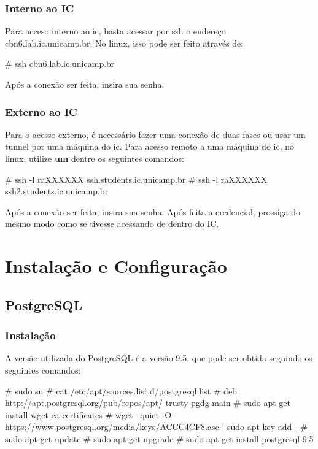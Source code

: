 \documentclass[a4paper,10pt]{article}
\begin{document}
        \subsubsection{Interno ao IC}
        Para acceso interno ao ic, basta acessar por ssh o endereço cbn6.lab.ic.unicamp.br. No linux, isso pode ser feito através de:
        \begin{spverbatim}
        # ssh cbn6.lab.ic.unicamp.br
        \end{spverbatim}

        Após a conexão ser feita, insira sua senha.
        \subsubsection{Externo ao IC}
        Para o acesso externo, é necessário fazer uma conexão de duas fases ou usar um tunnel por uma máquina do ic. Para acesso remoto a uma máquina do ic, no linux, utilize \textbf{um} dentre os seguintes comandos:
        \begin{spverbatim}
        # ssh -l raXXXXXX ssh.students.ic.unicamp.br
        # ssh -l raXXXXXX ssh2.students.ic.unicamp.br
        \end{spverbatim}

        Após a conexão ser feita, insira sua senha. Após feita a credencial, prossiga do mesmo modo como se tivesse acessando de dentro do IC.

\section{Instalação e Configuração}
    \subsection{PostgreSQL}
        \subsubsection{Instalação}
        A versão utilizada do PostgreSQL é a versão 9.5, que pode ser obtida seguindo os seguintes comandos:
        \begin{spverbatim}
        # sudo su
        # cat /etc/apt/sources.list.d/postgresql.list
        # deb http://apt.postgresql.org/pub/repos/apt/ trusty-pgdg main
        # sudo apt-get install wget ca-certificates
        # wget --quiet -O - https://www.postgresql.org/media/keys/ACCC4CF8.asc | sudo apt-key add -
        # sudo apt-get update
        # sudo apt-get upgrade
        # sudo apt-get install postgresql-9.5

        \end{spverbatim}
\end{document}
